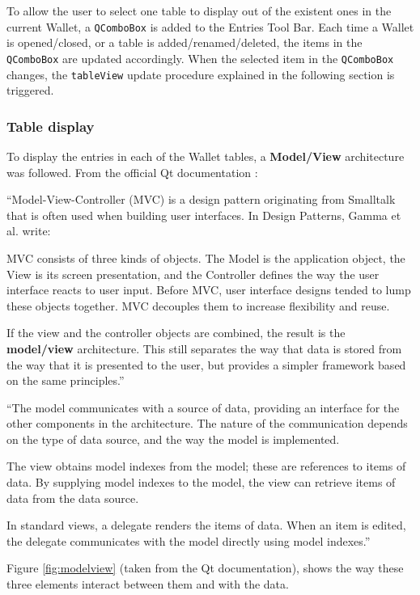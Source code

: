 To allow the user to select one table to display out of the existent ones in the current Wallet, a \texttt{QComboBox} is added to the Entries Tool Bar. Each time a Wallet is opened/closed, or a table is added/renamed/deleted, the items in the \texttt{QComboBox} are updated accordingly. When the selected item in the \texttt{QComboBox} changes, the \texttt{tableView} update procedure explained in the following section is triggered.

\subsubsection*{Table display}
To display the entries in each of the Wallet tables, a \textbf{Model/View} architecture was followed. From the official Qt documentation \cite{modelview}:
 
``Model-View-Controller (MVC) is a design pattern originating from Smalltalk that is often used when building user interfaces. In Design Patterns, Gamma et al. write:

MVC consists of three kinds of objects. The Model is the application object, the View is its screen presentation, and the Controller defines the way the user interface reacts to user input. Before MVC, user interface designs tended to lump these objects together. MVC decouples them to increase flexibility and reuse.

If the view and the controller objects are combined, the result is the \textbf{model/view} architecture. This still separates the way that data is stored from the way that it is presented to the user, but provides a simpler framework based on the same principles.''

``The model communicates with a source of data, providing an interface for the other components in the architecture. The nature of the communication depends on the type of data source, and the way the model is implemented.

The view obtains model indexes from the model; these are references to items of data. By supplying model indexes to the model, the view can retrieve items of data from the data source.

In standard views, a delegate renders the items of data. When an item is edited, the delegate communicates with the model directly using model indexes.''

Figure \ref{fig:modelview} (taken from the Qt documentation), shows the way these three elements interact between them and with the data. 

